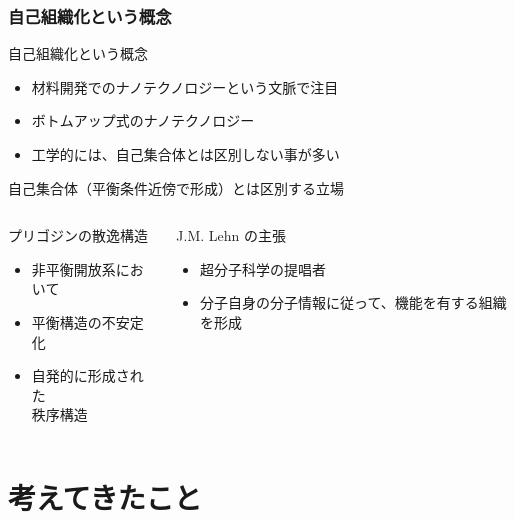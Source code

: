 \documentclass[12pt, dvipdfmx]{beamer}
\begin{document}
\begin{frame}
    \frametitle{自己組織化という概念}
    \begin{block}{自己組織化という概念}
        \begin{itemize}
            \item 材料開発でのナノテクノロジーという文脈で注目
            \item ボトムアップ式のナノテクノロジー
            \item 工学的には、自己集合体とは区別しない事が多い
        \end{itemize}
    \end{block}
    \begin{exampleblock}{自己集合体（平衡条件近傍で形成）とは区別する立場}
        \begin{columns}[T, onlytextwidth]
            \begin{alertblock}{プリゴジンの散逸構造}
                \begin{itemize}
                    \item 非平衡開放系において
                    \item 平衡構造の不安定化
                    \item 自発的に形成された\\秩序構造
                \end{itemize}
            \end{alertblock}
            \begin{alertblock}{J.M. Lehn の主張}
                \begin{itemize}
                    \item 超分子科学の提唱者
                    \item 分子自身の分子情報に従って、機能を有する組織を形成
                \end{itemize}
            \end{alertblock}
        \end{columns}
    \end{exampleblock}
\end{frame}

\section{考えてきたこと}
\end{document}
